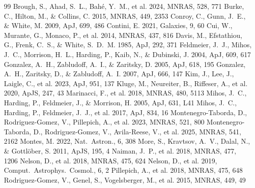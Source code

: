 \documentclass[usenatbib]{mnras}
\begin{document}
\begin{thebibliography}{99}
Brough, S., Ahad, S.~L., Bah\'e, Y.~M., et al. 2024, MNRAS, 528, 771
Burke, C., Hilton, M., \& Collins, C. 2015, MNRAS, 449, 2353
Conroy, C., Gunn, J.~E., \& White, M. 2009, ApJ, 699, 486
Contini, E. 2021, Galaxies, 9, 60
Cui, W., Murante, G., Monaco, P., et al. 2014, MNRAS, 437, 816
Davis, M., Efstathiou, G., Frenk, C.~S., \& White, S.~D.~M. 1985, ApJ, 292, 371
Feldmeier, J.~J., Mihos, J.~C., Morrison, H.~L., Harding, P., Kaib, N., \& Dubinski, J. 2004, ApJ, 609, 617
Gonzalez, A.~H., Zabludoff, A.~I., \& Zaritsky, D. 2005, ApJ, 618, 195
Gonzalez, A.~H., Zaritsky, D., \& Zabludoff, A.~I. 2007, ApJ, 666, 147
Kim, J., Lee, J., Laigle, C., et al. 2023, ApJ, 951, 137
Kluge, M., Neureiter, B., Riffeser, A., et al. 2020, ApJS, 247, 43
Marinacci, F., et al. 2018, MNRAS, 480, 5113
Mihos, J.~C., Harding, P., Feldmeier, J., \& Morrison, H. 2005, ApJ, 631, L41
Mihos, J.~C., Harding, P., Feldmeier, J.~J., et al. 2017, ApJ, 834, 16
Montenegro-Taborda, D., Rodriguez-Gomez, V., Pillepich, A., et al. 2023, MNRAS, 521, 800
Montenegro-Taborda, D., Rodriguez-Gomez, V., Avila-Reese, V., et al. 2025, MNRAS, 541, 2162
Montes, M. 2022, Nat.\ Astron., 6, 308
More, S., Kravtsov, A.~V., Dalal, N., \& Gottl\"ober, S. 2011, ApJS, 195, 4
Naiman, J.~P., et al. 2018, MNRAS, 477, 1206
Nelson, D., et al. 2018, MNRAS, 475, 624
Nelson, D., et al. 2019, Comput.\ Astrophys.\ Cosmol., 6, 2
Pillepich, A., et al. 2018, MNRAS, 475, 648
Rodriguez-Gomez, V., Genel, S., Vogelsberger, M., et al. 2015, MNRAS, 449, 49

\end{thebibliography}
\end{document}
